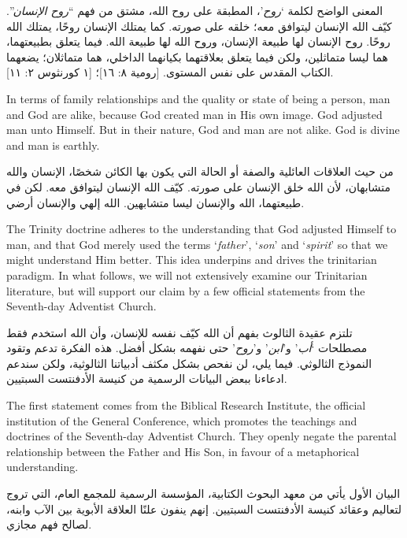 المعنى الواضح لكلمة ‘\textit{روح}’، المطبقة على روح الله، مشتق من فهم “\textit{روح الإنسان}”. كيّف الله الإنسان ليتوافق معه؛ خلقه على صورته. كما يمتلك الإنسان روحًا، يمتلك الله روحًا. روح الإنسان لها طبيعة الإنسان، وروح الله لها طبيعة الله. فيما يتعلق بطبيعتهما، هما ليسا متماثلين، ولكن فيما يتعلق بعلاقتهما بكيانهما الداخلي، هما متماثلان؛ يضعهما الكتاب المقدس على نفس المستوى. [رومية ٨: ١٦]؛ [١ كورنثوس ٢: ١١].


In terms of family relationships and the quality or state of being a person, man and God are alike, because God created man in His own image. God adjusted man unto Himself. But in their nature, God and man are not alike. God is divine and man is earthly.


من حيث العلاقات العائلية والصفة أو الحالة التي يكون بها الكائن شخصًا، الإنسان والله متشابهان، لأن الله خلق الإنسان على صورته. كيّف الله الإنسان ليتوافق معه. لكن في طبيعتهما، الله والإنسان ليسا متشابهين. الله إلهي والإنسان أرضي.


The Trinity doctrine adheres to the understanding that God adjusted Himself to man, and that God merely used the terms ‘\textit{father}’, ‘\textit{son}’ and ‘\textit{spirit}’ so that we might understand Him better. This idea underpins and drives the trinitarian paradigm. In what follows, we will not extensively examine our Trinitarian literature, but will support our claim by a few official statements from the Seventh-day Adventist Church.


تلتزم عقيدة الثالوث بفهم أن الله كيّف نفسه للإنسان، وأن الله استخدم فقط مصطلحات ‘\textit{أب}’ و’\textit{ابن}’ و’\textit{روح}’ حتى نفهمه بشكل أفضل. هذه الفكرة تدعم وتقود النموذج الثالوثي. فيما يلي، لن نفحص بشكل مكثف أدبياتنا الثالوثية، ولكن سندعم ادعاءنا ببعض البيانات الرسمية من كنيسة الأدفنتست السبتيين.


The first statement comes from the Biblical Research Institute, the official institution of the General Conference, which promotes the teachings and doctrines of the Seventh-day Adventist Church. They openly negate the parental relationship between the Father and His Son, in favour of a metaphorical understanding.


البيان الأول يأتي من معهد البحوث الكتابية، المؤسسة الرسمية للمجمع العام، التي تروج لتعاليم وعقائد كنيسة الأدفنتست السبتيين. إنهم ينفون علنًا العلاقة الأبوية بين الآب وابنه، لصالح فهم مجازي.


